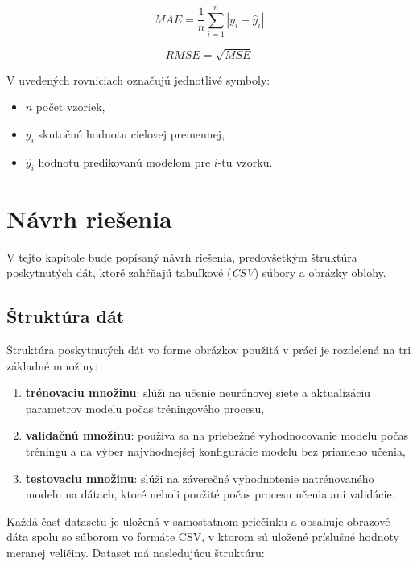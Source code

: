 \begin{equation*}
MAE = \frac{1}{n}\sum_{i=1}^{n}|y_i - \hat{y}_i|
\end{equation*}

\begin{equation*}
RMSE = \sqrt{MSE}
\end{equation*}

\noindent V uvedených rovniciach označujú jednotlivé symboly:
\begin{itemize}
    \item $n$ počet vzoriek,
    \item $y_i$ skutočnú hodnotu cieľovej premennej,
    \item $\hat{y}_i$ hodnotu predikovanú modelom pre $i$-tu vzorku.
\end{itemize}





\section{Návrh riešenia}
V tejto kapitole bude popísaný návrh riešenia, predovšetkým štruktúra poskytnutých dát, ktoré zahŕňajú tabuľkové (\textit{CSV}) súbory a obrázky oblohy.




\vspace{\baselineskip}
\subsection{Štruktúra dát}
Štruktúra poskytnutých dát vo forme obrázkov použitá v práci je rozdelená na tri základné množiny: 
\begin{enumerate}
    \item \textbf{trénovaciu množinu}: slúži na učenie neurónovej siete a aktualizáciu parametrov modelu počas tréningového procesu,

    \item \textbf{validačnú množinu}: používa sa na priebežné vyhodnocovanie modelu počas tréningu a na výber najvhodnejšej konfigurácie modelu bez priameho učenia,

    \item \textbf{testovaciu množinu}: slúži na záverečné vyhodnotenie natrénovaného modelu na dátach, ktoré neboli použité počas procesu učenia ani validácie.
\end{enumerate}
Každá časť datasetu je uložená v samostatnom priečinku a obsahuje obrazové dáta spolu so súborom vo formáte CSV, v ktorom sú uložené príslušné hodnoty meranej veličiny. Dataset má nasledujúcu štruktúru:

